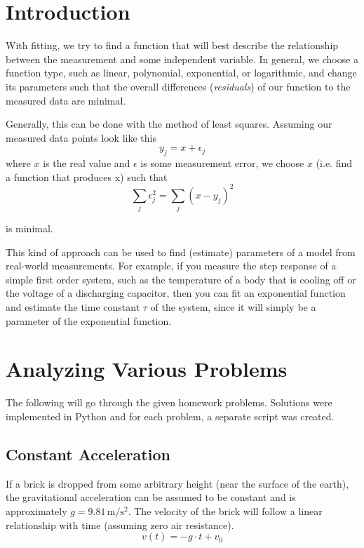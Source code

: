 \documentclass[10pt, a4paper]{article}
\begin{document}


\section{Introduction}
With fitting, we try to find a function that will best describe the relationship between the measurement and some independent variable. In general, we choose a function type, such as linear, polynomial, exponential, or logarithmic, and change its parameters such that the overall differences (\textit{residuals}) of our function to the measured data are minimal.

Generally, this can be done with the method of least squares.
Assuming our measured data points look like this
\[
  y_{j} = x + \epsilon_{j}
\]
where $x$ is the real value and $\epsilon$ is some measurement error, we choose $x$ (i.e. find a function that produces x) such that
\[
  \sum_{j}{\epsilon_{j}^{2}} = \sum_{j}{ (x - y_{j})^{2} }
\]

is minimal. \cite{brandt_data}\cite{wentura_data}

This kind of approach can be used to find (estimate) parameters of a model from real-world measurements. For example, if you measure the step response of a simple first order system, such as the temperature of a body that is cooling off or the voltage of a discharging capacitor, then you can fit an exponential function and estimate the time constant $\tau$ of the system, since it will simply be a parameter of the exponential function.

\section{Analyzing Various Problems}

The following will go through the given homework problems.
Solutions were implemented in Python and for each problem, a separate script was created.

\subsection{Constant Acceleration}
If a brick is dropped from some arbitrary height (near the surface of the earth), the gravitational acceleration can be assumed to be constant and is approximately $g = 9.81 \,\si{\meter\per\second\squared}$. The velocity of the brick will follow a linear relationship with time (assuming zero air resistance).
\[
  v(t) = -g \cdot t + v_{0}
\]
\end{document}
